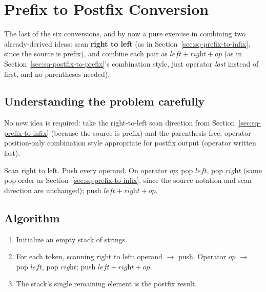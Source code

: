 \section{Prefix to Postfix Conversion}
\label{sec:sq-prefix-to-postfix}


\begin{patternbox}
The last of the six conversions, and by now a pure exercise in combining
two already-derived ideas: scan \textbf{right to left} (as in
Section~\ref{sec:sq-prefix-to-infix}, since the source is prefix), and
combine each pair as $\textit{left} + \textit{right} + \textit{op}$ (as in
Section~\ref{sec:sq-postfix-to-prefix}'s combination style, just operator
\emph{last} instead of first, and no parentheses needed).
\end{patternbox}

\subsection*{Understanding the problem carefully}

No new idea is required: take the right-to-left scan direction from
Section~\ref{sec:sq-prefix-to-infix} (because the source is prefix) and
the parenthesis-free, operator-position-only combination style appropriate
for postfix output (operator written last).

\begin{ideabox}
Scan right to left. Push every operand. On operator $\textit{op}$: pop
$\textit{left}$, pop $\textit{right}$ (same pop order as
Section~\ref{sec:sq-prefix-to-infix}, since the source notation and scan
direction are unchanged); push $\textit{left} + \textit{right} +
\textit{op}$.
\end{ideabox}

\subsection*{Algorithm}

\begin{enumerate}
  \item Initialize an empty stack of strings.
  \item For each token, scanning right to left: operand $\to$ push.
        Operator $\textit{op}$ $\to$ pop $\textit{left}$, pop
        $\textit{right}$; push $\textit{left} + \textit{right} +
        \textit{op}$.
  \item The stack's single remaining element is the postfix result.
\end{enumerate}

